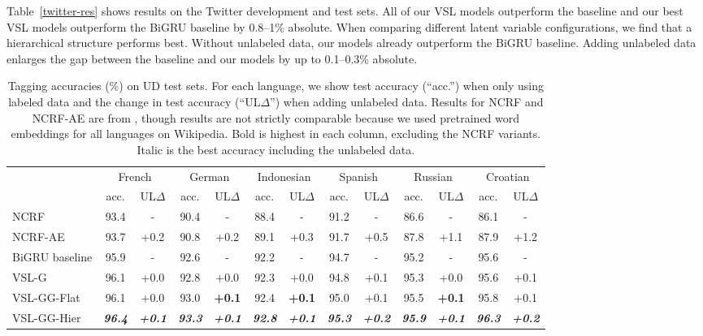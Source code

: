 \documentclass[11pt,a4paper]{article}
\newcommand{\vsmg}{VSL-G\xspace}
\newcommand{\vsmggflat}{VSL-GG-Flat\xspace}
\newcommand{\vsmgghier}{VSL-GG-Hier\xspace}
\begin{document}
Table~\ref{twitter-res} shows results on the Twitter development and test sets.
All of our VSL models outperform the baseline and our best VSL models outperform the BiGRU baseline by 0.8\---1\% absolute. When comparing different latent variable configurations, we find that a hierarchical structure performs best. Without unlabeled data, our models already outperform the BiGRU baseline.
Adding unlabeled data enlarges the gap between the baseline and our models by up to 0.1\---0.3\% absolute.


\begin{table*}[t]
\setlength{\tabcolsep}{4pt}
\centering
\begin{tabular}{l|c|c|c|c|c|c|c|c|c|c|c|c}
        & \multicolumn{2}{c|}{French} & \multicolumn{2}{c|}{German} & \multicolumn{2}{c|}{Indonesian} & \multicolumn{2}{c|}{Spanish} & \multicolumn{2}{c|}{Russian} & \multicolumn{2}{c}{Croatian} \\
        & \multicolumn{1}{c}{acc.} & UL$\Delta$
        & \multicolumn{1}{c}{acc.} & UL$\Delta$
        & \multicolumn{1}{c}{acc.} & UL$\Delta$
        & \multicolumn{1}{c}{acc.} & UL$\Delta$
        & \multicolumn{1}{c}{acc.} & UL$\Delta$
        & \multicolumn{1}{c}{acc.} & UL$\Delta$ \\
\hline
NCRF               & 93.4 &   -  & 90.4 &   -   & 88.4 &   -  & 91.2 &   -  & 86.6 &   -  & 86.1 &  -   \\
NCRF-AE            & 93.7 & +0.2 & 90.8 & +0.2  & 89.1 & +0.3 & 91.7 & +0.5 & 87.8 & +1.1 & 87.9 & +1.2 \\
\hline
BiGRU baseline     & 95.9 &   -   & 92.6 &   -  & 92.2 &   -   & 94.7 &   -  & 95.2 &   -  & 95.6 &  -   \\
\vsmg              & 96.1 & +0.0  & 92.8  & +0.0 & 92.3 & +0.0 & 94.8 & +0.1 & 95.3 & +0.0 & 95.6 &  +0.1  \\
\vsmggflat         & 96.1 & +0.0  & 93.0  & \textbf{+0.1} & 92.4 & \textbf{+0.1} & 95.0 & +0.1 & 95.5 & \textbf{+0.1} & 95.8 & +0.1 \\
\vsmgghier         & \textit{\textbf{96.4}} & \textit{\textbf{+0.1}}  & \textit{\textbf{93.3}} & \textit{\textbf{+0.1}} & \textit{\textbf{92.8}} & \textit{\textbf{+0.1}} & \textit{\textbf{95.3}} & \textit{\textbf{+0.2}} & \textit{\textbf{95.9}} & \textit{\textbf{+0.1}} & \textit{\textbf{96.3}} & \textit{\textbf{+0.2}} \\
\end{tabular}
\caption{Tagging accuracies (\%) on UD test sets. For each language, we show test accuracy (``acc.'') when only using labeled data and the change in test accuracy (``UL$\Delta$'') when adding unlabeled data. Results for NCRF and NCRF-AE are from \citet{zhang2017semi}, though results are not strictly comparable because we used pretrained word embeddings for all languages on Wikipedia. Bold is highest in each column, excluding the NCRF variants. Italic is the best accuracy including the unlabeled data.
}
\label{ud-res}
\end{table*}
\end{document}
